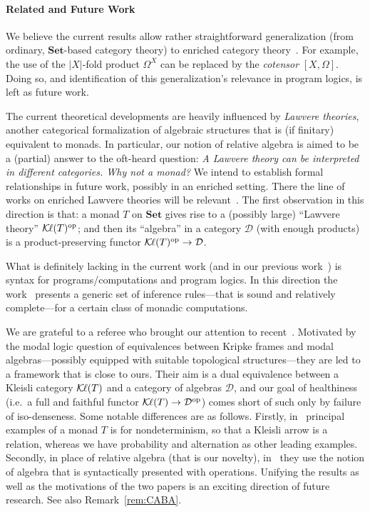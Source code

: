 \documentclass[9pt, preprint]{sigplanconf}
\theoremstyle{theorem}
\theoremstyle{definition}
\newcommand{\cat}[1]{\mathcal{#1}}
\newcommand{\op}{\mathrm{op}}
\newcommand{\Set}{\mathbf{Set}}
\newcommand{\Sets}{\Set}
\newcommand{\Kl}{\mathcal{K}{\kern-.2ex}\ell}
\begin{document}
\paragraph{Related and Future Work}
We believe the current results allow rather straightforward
generalization (from ordinary, $\Sets$-based category theory) to
enriched category theory~\cite{Kelly82}. For example, the use of
the $|X|$-fold product $\Omega^X$ can be replaced by the \emph{cotensor}
$[X,\Omega]$. Doing so, and identification of this generalization's
relevance in program logics, is left as future work.

The current theoretical developments are heavily influenced by
\emph{Lawvere theories}, another categorical formalization of algebraic
structures that is (if finitary) equivalent to monads.
In particular, our notion of relative algebra is aimed to be a (partial)
answer to the oft-heard question: \emph{A Lawvere theory can be interpreted
in different categories. Why not a monad?} We intend to
establish
formal relationships in  future work, possibly in an enriched
setting.
 There the line of works on enriched Lawvere theories will be
relevant~\cite{LackP09,hyland2007category}.
The first observation in this direction is that: a monad $T$ on $\Sets$
gives rise to a (possibly large) ``Lawvere theory'' $\Kl(T)^{\op}$; and
then its ``algebra'' in a category $\mathcal{D}$ (with enough products)
is a product-preserving functor $\Kl(T)^{\op}\to \mathcal{D}$. 

What is definitely lacking in the current work (and in our previous work~\cite{Jacobs15CALCO,Hasuo15TCS}) is  syntax for
programs/computations and program logics. In this direction the
work~\cite{GoncharovS13b} presents a generic  set of inference
rules---that is sound and relatively
complete---for a certain class of monadic computations.

We are grateful to a referee who brought our attention to
recent~\cite{HofmannN15}. Motivated by the modal logic question of
equivalences between Kripke frames and modal algebras---possibly
equipped with suitable topological structures---they are led to a
framework that is close to ours.  Their aim is a dual equivalence
between a Kleisli category $\Kl(T)$ and a category of algebras
$\cat{D}$, and our goal of healthiness (i.e.\ a full and faithful
functor $\Kl(T)\to \cat{D}^{\op}$) comes short of such only by failure of
iso-denseness. Some notable differences are as follows. Firstly,
in~\cite{HofmannN15} principal examples of a monad $T$ is for
nondeterminism, so that a Kleisli arrow is a relation, whereas we have
probability and alternation as other leading examples.  Secondly, in
place of relative algebra (that is our novelty), in~\cite{HofmannN15}
they use the notion of algebra that is syntactically presented with
operations. Unifying the results as well as the motivations of the two
papers is an exciting direction of future research. See also
Remark~\ref{rem:CABA}.
\end{document}
